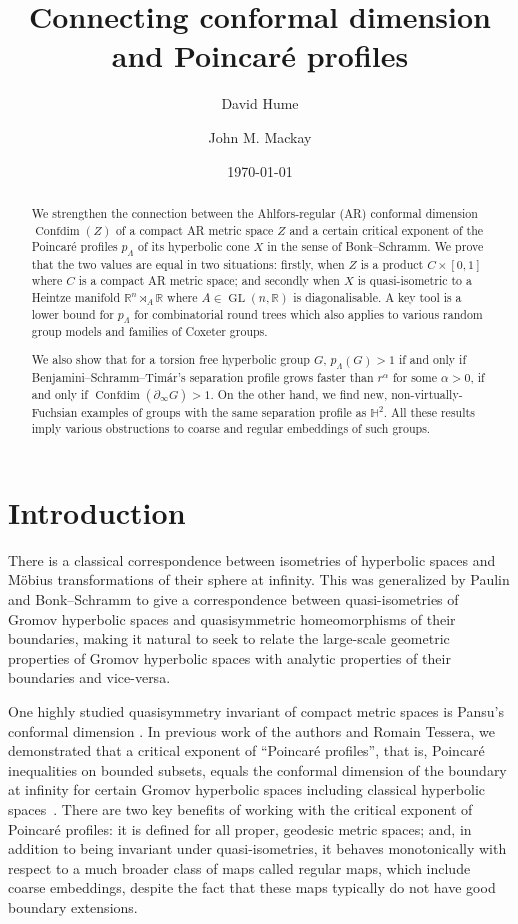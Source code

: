 \documentclass[11pt]{amsart}
\title{Connecting conformal dimension and Poincar\'e profiles}
\author{David Hume}
\author{John M. Mackay}
\date{\today}
\numberwithin{equation}{section}
\theoremstyle{citing}
\DeclareMathOperator{\GL}{GL}
\DeclareMathOperator{\Confdim}{Confdim}
\newcommand{\bdry}{\partial_\infty}
\newcommand{\R}{\mathbb{R}}
\newcommand{\pcrit}{p_{\Lambda}}
\numberwithin{equation}{section}
\begin{document}
\begin{abstract} 
	We strengthen the connection between the Ahlfors-regular (AR) conformal dimension $\Confdim(Z)$ of a compact AR metric space $Z$ and a certain critical exponent of the Poincar\'e profiles $\pcrit$ of its hyperbolic cone $X$ in the sense of Bonk--Schramm. We prove that the two values are equal in two situations: firstly, when $Z$ is a product $C\times [0,1]$ where $C$ is a compact AR metric space; and secondly when $X$ is quasi-isometric to a Heintze manifold $\R^n\rtimes_A\R$ where $A\in\GL(n,\R)$ is diagonalisable.  A key tool is a lower bound for $\pcrit$ for combinatorial round trees which also applies to various random group models and families of Coxeter groups.

	We also show that for a torsion free hyperbolic group $G$, $\pcrit(G)>1$ if and only if Benjamini--Schramm--Tim\'ar's separation profile grows faster than $r^\alpha$ for some $\alpha>0$, if and only if $\Confdim(\bdry G)>1$.  On the other hand, we find new, non-virtually-Fuchsian examples of groups with the same separation profile as $\mathbb{H}^2$.
	All these results imply various obstructions to coarse and regular embeddings of such groups.  
\end{abstract}

\maketitle


\section{Introduction}
\label{sec:intro}

There is a classical correspondence between isometries of hyperbolic spaces and M\"obius transformations of their sphere at infinity.
This was generalized by Paulin and Bonk--Schramm to give a correspondence between quasi-isometries of Gromov hyperbolic spaces and quasisymmetric homeomorphisms of their boundaries, making it natural to seek to relate the large-scale geometric properties of Gromov hyperbolic spaces with analytic properties of their boundaries and vice-versa.

One highly studied quasisymmetry invariant of compact metric spaces is Pansu's conformal dimension \cite{Pan-89-cdim}. In previous work of the authors and Romain Tessera, 
we demonstrated that a critical exponent of ``Poincar\'e profiles'', that is,  Poincar\'e inequalities on bounded subsets, equals the conformal dimension of the boundary at infinity for certain Gromov hyperbolic spaces including classical hyperbolic spaces~\cite{HumeMackTess-Pprof, HumeMackTess-PprofLie}. There are two key benefits of working with the critical exponent of Poincar\'e profiles: it is defined for all proper, geodesic metric spaces; and, in addition to being invariant under quasi-isometries, it behaves monotonically with respect to a much broader class of maps called regular maps, which include coarse embeddings, despite the fact that these maps typically do not have good boundary extensions.
\end{document}
